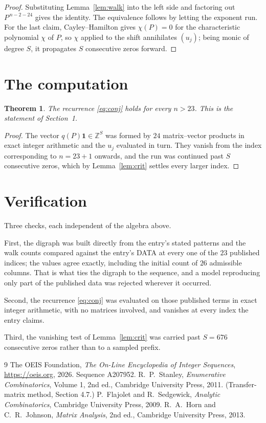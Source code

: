 \documentclass[11pt,a4paper]{article}
\theoremstyle{plain}
\newtheorem{theorem}{Theorem}
\theoremstyle{definition}
\begin{document}
\begin{proof}
Substituting Lemma~\ref{lem:walk} into the left side and factoring out
$P^{\,n-2-24}$ gives the identity. The equivalence follows by letting the exponent
run. For the last claim, Cayley--Hamilton gives $\chi(P)=0$ for the characteristic
polynomial $\chi$ of $P$, so $\chi$ applied to the shift annihilates $(u_j)$; being monic of
degree $S$, it propagates $S$ consecutive zeros forward.
\end{proof}

\section{The computation}

\begin{theorem}
The recurrence \eqref{eq:conj} holds for every $n>23$. This is the statement of
Section~1.
\end{theorem}

\begin{proof}
The vector $q(P)\mathbf{1}\in\mathbb{Z}^{S}$ was formed by $24$ matrix--vector
products in exact integer arithmetic and the $u_j$ evaluated in turn. They vanish from the
index corresponding to $n=23+1$ onwards, and the run was continued past $S$ consecutive
zeros, which by Lemma~\ref{lem:crit} settles every larger index.
\end{proof}

\section{Verification}

Three checks, each independent of the algebra above.

First, the digraph was built directly from the entry's stated patterns and the walk counts
compared against the entry's DATA at every one of the $23$ published indices; the
values agree exactly, including the initial count of $26$ admissible columns. That is
what ties the digraph to the sequence, and a model reproducing only part of the published
data was rejected wherever it occurred.

Second, the recurrence \eqref{eq:conj} was evaluated on those published terms in exact
integer arithmetic, with no matrices involved, and vanishes at every index the entry claims.

Third, the vanishing test of Lemma~\ref{lem:crit} was carried past $S=676$ consecutive
zeros rather than to a sampled prefix.

\begin{thebibliography}{9}
 The OEIS Foundation, \emph{The On-Line Encyclopedia of Integer
Sequences}, \url{https://oeis.org}, 2026. Sequence A207952.
 R.~P.~Stanley, \emph{Enumerative Combinatorics}, Volume 1, 2nd ed.,
Cambridge University Press, 2011. (Transfer-matrix method, Section 4.7.)
 P.~Flajolet and R.~Sedgewick, \emph{Analytic Combinatorics}, Cambridge
University Press, 2009.
 R.~A.~Horn and C.~R.~Johnson, \emph{Matrix Analysis}, 2nd ed., Cambridge
University Press, 2013.
\end{thebibliography}
\end{document}
